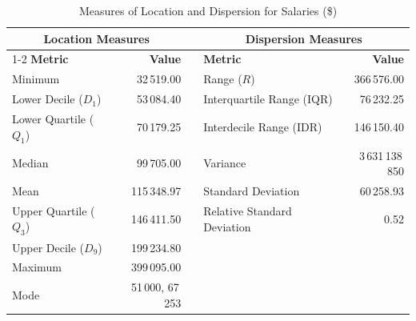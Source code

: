 \documentclass[12pt, a4paper, titlepage]{article}
\begin{document}
\begin{table}[htbp]
    \centering
    \begin{threeparttable}
        \caption{Measures of Location and Dispersion for Salaries (\$)}
        \label{tab:location_dispersion_metrics}
        \begin{tabular}{lr p{0.5cm} lr}
            \toprule
            \multicolumn{2}{c}{\textbf{Location Measures}} &                  & \multicolumn{2}{c}{\textbf{Dispersion Measures}}                                                  \\
            \cmidrule{1-2} \cmidrule{4-5}
            \textbf{Metric}                                & \textbf{Value}   &                                                  & \textbf{Metric}             & \textbf{Value}   \\
            \midrule
            Minimum                                        & 32\,519.00       &                                                  & Range ($R$)                 & 366\,576.00      \\
            Lower Decile ($D_1$)                           & 53\,084.40       &                                                  & Interquartile Range (IQR)   & 76\,232.25       \\
            Lower Quartile ($Q_1$)                         & 70\,179.25       &                                                  & Interdecile Range (IDR)     & 146\,150.40      \\
            Median                                         & 99\,705.00       &                                                  & Variance                    & 3\,631\,138\,850 \\
            Mean                                           & 115\,348.97      &                                                  & Standard Deviation          & 60\,258.93       \\
            Upper Quartile ($Q_3$)                         & 146\,411.50      &                                                  & Relative Standard Deviation & 0.52             \\
            Upper Decile ($D_9$)                           & 199\,234.80      &                                                  &                             &                  \\
            Maximum                                        & 399\,095.00      &                                                  &                             &                  \\
            Mode                                           & 51\,000, 67\,253 &                                                  &                             &                  \\
            \bottomrule
        \end{tabular}
    \end{threeparttable}
\end{table}
\end{document}
